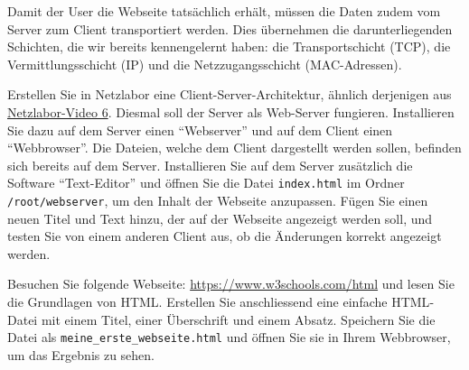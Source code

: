 Damit der User die Webseite tatsächlich erhält, müssen die Daten zudem vom Server zum Client transportiert werden. Dies übernehmen die darunterliegenden Schichten, die wir bereits kennengelernt haben: die Transportschicht (\gls{TCP}), die Vermittlungsschicht (\gls{IP}) und die Netzzugangsschicht (\gls{MAC}-Adressen).

\begin{myexercise}
	Erstellen Sie in Netzlabor eine Client-Server-Architektur, ähnlich derjenigen aus \href{\netzlaborvideos}{Netzlabor-Video 6}. Diesmal soll der Server als Web-Server fungieren. Installieren Sie dazu auf dem Server einen \enquote{Webserver} und auf dem Client einen \enquote{Webbrowser}. Die Dateien, welche dem Client dargestellt werden sollen, befinden sich bereits auf dem Server. Installieren Sie auf dem Server zusätzlich die Software \enquote{Text-Editor} und öffnen Sie die Datei \texttt{index.html} im Ordner \texttt{/root/webserver}, um den Inhalt der Webseite anzupassen. Fügen Sie einen neuen Titel und Text hinzu, der auf der Webseite angezeigt werden soll, und testen Sie von einem anderen Client aus, ob die Änderungen korrekt angezeigt werden.
\end{myexercise}

\begin{mychallenge}
	Besuchen Sie folgende Webseite: \url{https://www.w3schools.com/html} und lesen Sie die Grundlagen von \gls{HTML}. Erstellen Sie anschliessend eine einfache \gls{HTML}-Datei mit einem Titel, einer Überschrift und einem Absatz. Speichern Sie die Datei als \texttt{meine\_erste\_webseite.html} und öffnen Sie sie in Ihrem Webbrowser, um das Ergebnis zu sehen.
\end{mychallenge}

